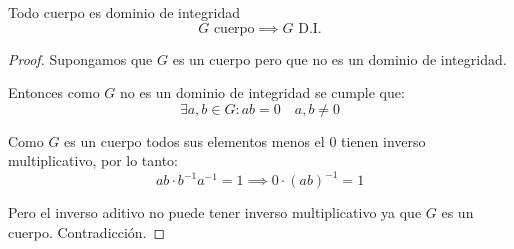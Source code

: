 \begin{thm}
    Todo cuerpo es dominio de integridad
    \begin{equation}
        G \text{ cuerpo} \implies G \text{ D.I.}
    \end{equation}
\end{thm}

\begin{proof}
    Supongamos que $G$ es un cuerpo pero que no es un dominio de integridad.

    Entonces como $G$ no es un dominio de integridad se cumple que:
    \begin{equation}
        \exists a, b \in G : ab = 0 \quad a,b \neq 0
    \end{equation}

    Como $G$ es un cuerpo todos sus elementos menos el $0$ tienen inverso multiplicativo, por lo tanto:
    \begin{equation}
        ab \cdot b^{-1}a^{-1} = 1 \implies 0 \cdot (ab)^{-1} = 1 
    \end{equation}

    Pero el inverso aditivo no puede tener inverso multiplicativo ya que $G$ es un cuerpo. Contradicción.
\end{proof}
